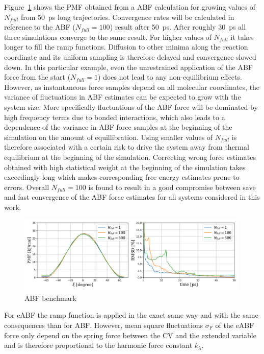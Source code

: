 Figure~\ref{fig:ABF benchmark} shows the PMF obtained from a ABF calculation for growing values of $N_{full}$ from 50~ps long trajectories.
Convergence rates will be calculated in reference to the ABF ($N_{full}=100$) result after 50~ps.
After roughly 30~ps all three simulations converge to the same result.
For higher values of $N_{full}$ it takes longer to fill the ramp functions.
Diffusion to other minima along the reaction coordinate and its uniform sampling is therefore delayed and convergence slowed down.
In this particular example, even the unrestrained application of the ABF force from the start ($N_{full}=1$) does not lead to any non-equilibrium effects.
However, as instantaneous force samples depend on all molecular coordinates, the variance of fluctuations in ABF estimates can be expected to grow with the system size.
More specifically fluctuations of the ABF force will be dominated by high frequency terms due to bonded interactions\autocite{lesage2017smoothed}, which also leads to a dependence of the variance in ABF force samples at the beginning of the simulation on the amount of equillibration.\autocite{blondel2004ensemble}
Using smaller values of $N_{full}$ is therefore associated with a certain risk to drive the system away from thermal equilibrium at the beginning of the simulation.
Correcting wrong force estimates obtained with high statistical weight at the beginning of the simulation takes exceedingly long which makes corresponding free energy estimates prone to errors.\autocite{comer2015adaptive}
Overall $N_{full}=100$ is found to result in a good compromise between save and fast convergence of the ABF force estimates for all systems considered in this work.
\begin{figure}[H]
    \centering
    \includegraphics[width=0.99\textwidth]{bilder/benchmark/ABF_benchmark_nfull}
    \caption{ABF benchmark}
    \label{fig:ABF benchmark}
\end{figure}
For eABF the ramp function is applied in the exact same way and with the same consequences than for ABF.\autocite{lesage2017smoothed}
However, mean square fluctuations $\sigma_F$ of the eABF force only depend on the spring force between the CV and the extended variable and is therefore proportional to the harmonic force constant $k_\lambda$.
